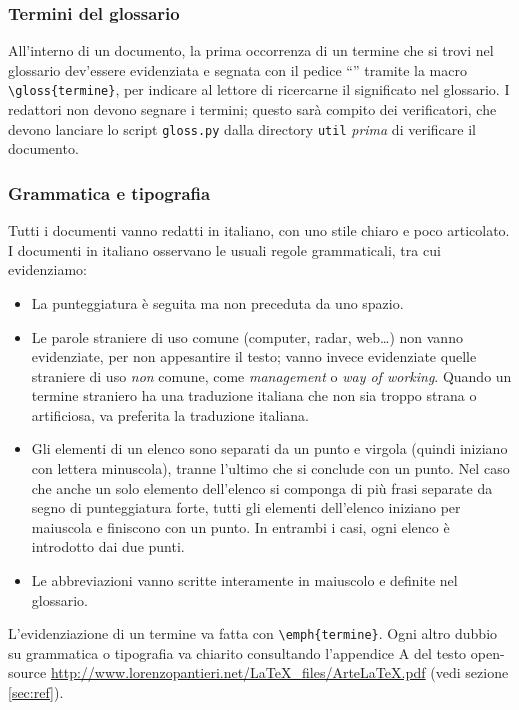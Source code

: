 \subsubsection{Termini del glossario} All'interno di un documento, la prima occorrenza di un termine che si trovi nel glossario dev'essere evidenziata e segnata con il pedice “” tramite la macro \texttt{\textbackslash gloss\{termine\}}, per indicare al lettore di ricercarne il significato nel glossario. I redattori non devono segnare i termini; questo sarà compito dei verificatori, che  devono lanciare lo script \texttt{gloss.py} dalla directory \texttt{util} \emph{prima} di verificare il documento.

\subsubsection{Grammatica e tipografia} Tutti i documenti vanno redatti in italiano, con uno stile chiaro e poco articolato. I documenti in italiano osservano le usuali regole grammaticali, tra cui evidenziamo:
\begin{itemize}
	\item La punteggiatura è seguita ma non preceduta da uno spazio.
	\item Le parole straniere di uso comune (computer, radar, web\dots) non vanno evidenziate, per non appesantire il testo; vanno invece evidenziate quelle straniere di uso \emph{non} comune, come \emph{management} o \emph{way of working}. Quando un termine straniero ha una traduzione italiana che non sia troppo strana o artificiosa, va preferita la traduzione italiana.
	\item Gli elementi di un elenco sono separati da un punto e virgola (quindi iniziano con lettera minuscola), tranne l'ultimo che si conclude con un punto. Nel caso che anche un solo elemento dell'elenco si componga di più frasi separate da segno di punteggiatura forte, tutti gli elementi dell'elenco iniziano per maiuscola e finiscono con un punto. In entrambi i casi, ogni elenco è introdotto dai due punti.
	\item Le abbreviazioni vanno scritte interamente in maiuscolo e definite nel glossario.
\end{itemize}
L'evidenziazione di un termine va fatta con \texttt{\textbackslash emph\{termine\}}. Ogni altro dubbio su grammatica o tipografia va chiarito consultando l'appendice A del testo open-source \url{http://www.lorenzopantieri.net/LaTeX_files/ArteLaTeX.pdf} (vedi sezione \ref{sec:ref}).

